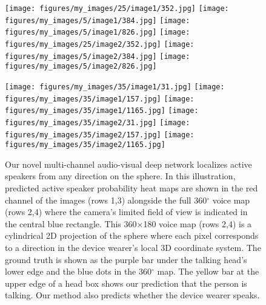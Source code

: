 \documentclass[10pt,twocolumn,letterpaper]{article}
\begin{document}
\begin{figure}[tb]
\centering
\texttt{[image: figures/my\_images/25/image1/352.jpg]}\hspace{\fill}
\texttt{[image: figures/my\_images/5/image1/384.jpg]}\hspace{\fill}
\texttt{[image: figures/my\_images/5/image1/826.jpg]}\linebreak
\texttt{[image: figures/my\_images/25/image2/352.jpg]}\hspace{\fill}
\texttt{[image: figures/my\_images/5/image2/384.jpg]}\hspace{\fill}
\texttt{[image: figures/my\_images/5/image2/826.jpg]}\vspace{0.2em}

\texttt{[image: figures/my\_images/35/image1/31.jpg]}\hspace{\fill}
\texttt{[image: figures/my\_images/35/image1/157.jpg]}\hspace{\fill}
\texttt{[image: figures/my\_images/35/image1/1165.jpg]}\linebreak
\texttt{[image: figures/my\_images/35/image2/31.jpg]}\hspace{\fill}
\texttt{[image: figures/my\_images/35/image2/157.jpg]}\hspace{\fill}
\texttt{[image: figures/my\_images/35/image2/1165.jpg]}\vspace{-5pt}
\caption{Our novel multi-channel audio-visual deep network localizes active speakers from any direction on the sphere. In this illustration, predicted active speaker probability heat maps are shown in the red channel of the images (rows 1,3) 
	alongside the full 360$^{\circ}$ voice map (rows 2,4) where the camera's limited field of view is indicated in the central blue rectangle. 
	This 360$\times$180 voice map (rows 2,4) is a cylindrical 2D projection of the sphere
	where each pixel corresponds to a direction in the device wearer's local 3D coordinate system. 
	The ground truth is shown as the purple bar under the talking head's 
	lower edge and the blue dots in the 360$^{\circ}$ map. The yellow bar at the upper edge of a head box shows
	our prediction that the person is talking. Our method also predicts whether the device wearer speaks.
	}
\vspace{-10pt}	
\label{fig:teaser}	
\end{figure}
\end{document}
